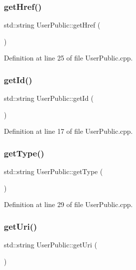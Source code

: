 \subsubsection{\texorpdfstring{get\+Href()}{getHref()}}
{\footnotesize\ttfamily std\+::string User\+Public\+::get\+Href (\begin{DoxyParamCaption}{ }\end{DoxyParamCaption})}



Definition at line 25 of file User\+Public.\+cpp.

\mbox{\label{class_user_public_ad7f4dfca9b262062b8679a58017fcf57}} 
\subsubsection{\texorpdfstring{get\+Id()}{getId()}}
{\footnotesize\ttfamily std\+::string User\+Public\+::get\+Id (\begin{DoxyParamCaption}{ }\end{DoxyParamCaption})}



Definition at line 17 of file User\+Public.\+cpp.

\mbox{\label{class_user_public_a4745f7124b3d9fde0db4a2bde510481d}} 
\subsubsection{\texorpdfstring{get\+Type()}{getType()}}
{\footnotesize\ttfamily std\+::string User\+Public\+::get\+Type (\begin{DoxyParamCaption}{ }\end{DoxyParamCaption})}



Definition at line 29 of file User\+Public.\+cpp.

\mbox{\label{class_user_public_a0f5b55782cec3e2116726fe74f585974}} 
\subsubsection{\texorpdfstring{get\+Uri()}{getUri()}}
{\footnotesize\ttfamily std\+::string User\+Public\+::get\+Uri (\begin{DoxyParamCaption}{ }\end{DoxyParamCaption})}



